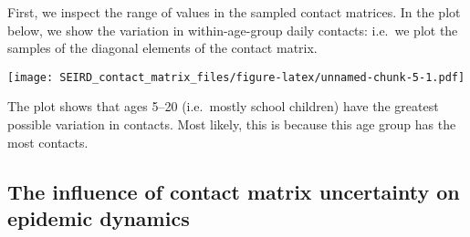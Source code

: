 \documentclass[
]{article}
\newenvironment{Shaded}{\begin{snugshade}}{\end{snugshade}}
\newcommand{\AttributeTok}[1]{\textcolor[rgb]{0.77,0.63,0.00}{#1}}
\newcommand{\ConstantTok}[1]{\textcolor[rgb]{0.00,0.00,0.00}{#1}}
\newcommand{\ControlFlowTok}[1]{\textcolor[rgb]{0.13,0.29,0.53}{\textbf{#1}}}
\newcommand{\DecValTok}[1]{\textcolor[rgb]{0.00,0.00,0.81}{#1}}
\newcommand{\FunctionTok}[1]{\textcolor[rgb]{0.00,0.00,0.00}{#1}}
\newcommand{\NormalTok}[1]{#1}
\newcommand{\OtherTok}[1]{\textcolor[rgb]{0.56,0.35,0.01}{#1}}
\newcommand{\SpecialCharTok}[1]{\textcolor[rgb]{0.00,0.00,0.00}{#1}}
\newcommand{\StringTok}[1]{\textcolor[rgb]{0.31,0.60,0.02}{#1}}
\begin{document}
First, we inspect the range of values in the sampled contact matrices.
In the plot below, we show the variation in within-age-group daily
contacts: i.e.~we plot the samples of the diagonal elements of the
contact matrix.

\begin{Shaded}
\end{Shaded}

\texttt{[image: SEIRD\_contact\_matrix\_files/figure-latex/unnamed-chunk-5-1.pdf]}

The plot shows that ages 5--20 (i.e.~mostly school children) have the
greatest possible variation in contacts. Most likely, this is because
this age group has the most contacts.

\hypertarget{the-influence-of-contact-matrix-uncertainty-on-epidemic-dynamics}{%
\subsection{The influence of contact matrix uncertainty on epidemic
dynamics}\label{the-influence-of-contact-matrix-uncertainty-on-epidemic-dynamics}}
\end{document}
